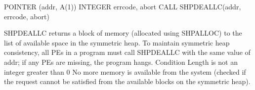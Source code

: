 \synF   %
POINTER (addr, A(1))
INTEGER errcode, abort
CALL SHPDEALLC(addr, errcode, abort)

 {
       SHPDEALLC  returns  a block of memory (allocated using SHPALLOC) to the
       list of available space in the symmetric heap.  To  maintain  symmetric
       heap  consistency, all \ac{PE}s in a program must call
       SHPDEALLC with the same value of addr; if  any  \ac{PE}s  are	 missing,  the
       program hangs.
  }
{
{}
\desR{ }
 {Condition}
 {Length is not an integer greater than 0}
 { No more memory is available from the system (checked  if the  request  cannot  be	satisfied from the available blocks on the symmetric heap).}
}%
\notesB{ }   
\eAPI 